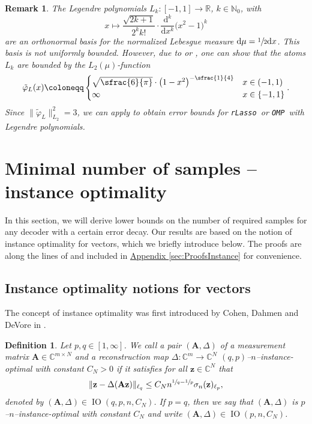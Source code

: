 \documentclass[11pt,reqno, a4paper]{article}
\numberwithin{equation}{section}
\newtheorem{remark}[theorem]{Remark}
\newtheorem{definition}[theorem]{Definition}
\newcommand{\C}{\mathbb{C}}
\newcommand{\rlasso}{\texttt{rLasso}}
\newcommand{\omp}{\texttt{OMP}}
\begin{document}
\begin{remark}
    The Legendre polynomials $L_k\colon [-1, 1] \to \mathbb{R}$, $k\in\mathbb{N}_0$, with
    \begin{equation}
        x \mapsto \frac{\sqrt{2k+1}}{2^kk!} \cdot \frac{\mathrm{d}^k}{\mathrm{d}x^k}\bigl(x^2-1\bigr)^k
    \end{equation}
    are an orthonormal basis for the normalized Lebesgue measure $\mathrm{d}\mu=\sfrac{1}{2}\mathrm{d}x$.
    This basis is not uniformly bounded.
    However, due to \cite[Lem.\ 5.1]{Rawa12} or \cite[Thm.\ 7.3.3]{Szego75}, one can show that the atoms $L_k$ are bounded by the $L_2(\mu)$-function
    \begin{equation}
        \tilde{\varphi}_L(x) \coloneqq
        \begin{cases}
            \sqrt{\sfrac{6}{\pi}} \cdot \bigl(1-x^2\bigr)^{-\sfrac{1}{4}} & x\in (-1, 1)\\
            \infty & x\in\{-1,1\}
        \end{cases}.
    \end{equation}
    Since $\lVert\tilde{\varphi}_L\rVert_{L_2}^2=3$, we can apply  to obtain error bounds for \rlasso \ or \omp \ with Legendre polynomials.
\end{remark}

\section{Minimal number of samples -- instance optimality}\label{sec:InstanceOptimality}
In this section, we will derive lower bounds on the number of required samples for any decoder with a certain error decay.
Our results are based on the notion of instance optimality for vectors, which we briefly introduce below.
The proofs are along the lines of \cite[Sec.\ 11]{FoRa13} and included in \hyperref[sec:ProofsInstance]{Appendix \ref*{sec:ProofsInstance}} for convenience.

\subsection{Instance optimality notions for vectors}\label{sec:InstanceOptVec}

The concept of instance optimality was first introduced by Cohen, Dahmen and DeVore in \cite{CDD09}.

\begin{definition}
Let $p,q\in[1,\infty]$. We call a pair $(\mathbf{A},\Delta)$ of a measurement matrix $\mathbf{A}\in\C^{m\times N}$ and a reconstruction map $\Delta \colon \C^m\to\C^N$ $(q,p)$--$n$--instance-optimal with constant $C_N>0$ if it satisfies for all $\mathbf{z}\in\C^N$ that
\begin{gather}\label{eq:InstOpt}
\lVert\mathbf{z}-\Delta(\mathbf{A}\mathbf{z})\rVert_{\ell_q}\leq C_Nn^{\sfrac{1}{q}-\sfrac{1}{p}}\sigma_n(\mathbf{z})_{\ell_p},
\end{gather}
denoted by $(\mathbf{A},\Delta)\in\operatorname{IO}(q,p,n,C_N)$. If $p=q$, then we say that $(\mathbf{A},\Delta)$ is $p$--$n$--instance-optimal with constant $C_N$ and write $(\mathbf{A},\Delta)\in\operatorname{IO}(p,n,C_N)$.
\end{definition}
\end{document}
